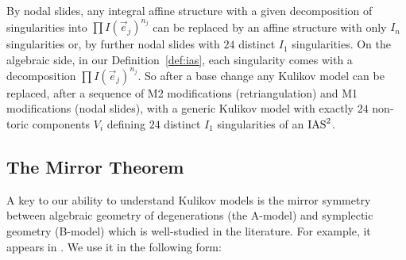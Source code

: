 \documentclass{amsart}
\begin{document}

\begin{remark}\label{rem:assume-generic}
By nodal slides, any integral affine structure
with a given decomposition of singularities into
$\prod I(\vec e_j)^{n_j}$ can be replaced by an affine structure with
only $I_n$ singularities or, by further nodal slides with $24$
distinct $I_1$ singularities. On the algebraic side, in our
Definition~\ref{def:ias}, each singularity comes with a decomposition
$\prod I(\vec e_j)^{n_j}$. So after a base change any Kulikov model
can be replaced, after a sequence of M2 modifications (retriangulation)
and M1 modifications (nodal slides), 
with a generic Kulikov model with exactly $24$ non-toric components
$V_i$ defining $24$ distinct $I_1$ singularities of an $\operatorname{IAS}^2$. 
\end{remark}

\subsection{The Mirror Theorem}
\label{sec:mirror-symmetry}

A key to our ability to understand Kulikov models is the mirror
symmetry between algebraic geometry of degenerations (the A-model) and
symplectic geometry (B-model) which is well-studied in the
literature. For example, it appears in
\cite{gross2003affine-manifolds, kontsevich2006affine-structures}. 
We use it in the following form:
\end{document}
